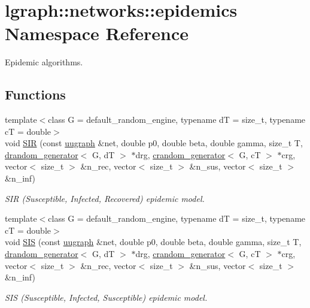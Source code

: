 \hypertarget{namespacelgraph_1_1networks_1_1epidemics}{}\section{lgraph\+:\+:networks\+:\+:epidemics Namespace Reference}
\label{namespacelgraph_1_1networks_1_1epidemics}


Epidemic algorithms.  


\subsection*{Functions}
\begin{DoxyCompactItemize}
\item 
{\footnotesize template$<$class G  = default\+\_\+random\+\_\+engine, typename dT  = size\+\_\+t, typename cT  = double$>$ }\\void \hyperlink{namespacelgraph_1_1networks_1_1epidemics_a1c81e4516170dc49264f27959db20c39}{S\+IR} (const \hyperlink{classlgraph_1_1utils_1_1uugraph}{uugraph} \&net, double p0, double beta, double gamma, size\+\_\+t T, \hyperlink{classlgraph_1_1utils_1_1drandom__generator}{drandom\+\_\+generator}$<$ G, dT $>$ $\ast$drg, \hyperlink{classlgraph_1_1utils_1_1crandom__generator}{crandom\+\_\+generator}$<$ G, cT $>$ $\ast$crg, vector$<$ size\+\_\+t $>$ \&n\+\_\+rec, vector$<$ size\+\_\+t $>$ \&n\+\_\+sus, vector$<$ size\+\_\+t $>$ \&n\+\_\+inf)
\begin{DoxyCompactList}\small\item\em S\+IR (Susceptible, Infected, Recovered) epidemic model. \end{DoxyCompactList}\item 
{\footnotesize template$<$class G  = default\+\_\+random\+\_\+engine, typename dT  = size\+\_\+t, typename cT  = double$>$ }\\void \hyperlink{namespacelgraph_1_1networks_1_1epidemics_a642f9b0f7d197f3ab1ec5d8aa3ab9f06}{S\+IS} (const \hyperlink{classlgraph_1_1utils_1_1uugraph}{uugraph} \&net, double p0, double beta, double gamma, size\+\_\+t T, \hyperlink{classlgraph_1_1utils_1_1drandom__generator}{drandom\+\_\+generator}$<$ G, dT $>$ $\ast$drg, \hyperlink{classlgraph_1_1utils_1_1crandom__generator}{crandom\+\_\+generator}$<$ G, cT $>$ $\ast$crg, vector$<$ size\+\_\+t $>$ \&n\+\_\+rec, vector$<$ size\+\_\+t $>$ \&n\+\_\+sus, vector$<$ size\+\_\+t $>$ \&n\+\_\+inf)
\begin{DoxyCompactList}\small\item\em S\+IS (Susceptible, Infected, Susceptible) epidemic model. \end{DoxyCompactList}\end{DoxyCompactItemize}


